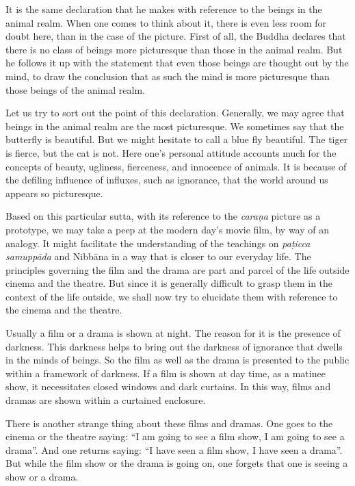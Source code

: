 It is the same declaration that he makes with reference to the beings in the animal realm. When one comes to think about it, there is even less room for doubt here, than in the case of the picture. First of all, the Buddha declares that there is no class of beings more picturesque than those in the animal realm. But he follows it up with the statement that even those beings are thought out by the mind, to draw the conclusion that as such the mind is more picturesque than those beings of the animal realm.

Let us try to sort out the point of this declaration. Generally, we may agree that beings in the animal realm are the most picturesque. We sometimes say that the butterfly is beautiful. But we might hesitate to call a blue fly beautiful. The tiger is fierce, but the cat is not. Here one's personal attitude accounts much for the concepts of beauty, ugliness, fierceness, and innocence of animals. It is because of the defiling influence of influxes, such as ignorance, that the world around us appears so picturesque.

Based on this particular sutta, with its reference to the \emph{caraṇa} picture as a prototype, we may take a peep at the modern day's movie film, by way of an analogy. It might facilitate the understanding of the teachings on \emph{paṭicca samuppāda} and Nibbāna in a way that is closer to our everyday life. The principles governing the film and the drama are part and parcel of the life outside cinema and the theatre. But since it is generally difficult to grasp them in the context of the life outside, we shall now try to elucidate them with reference to the cinema and the theatre.

Usually a film or a drama is shown at night. The reason for it is the presence of darkness. This darkness helps to bring out the darkness of ignorance that dwells in the minds of beings. So the film as well as the drama is presented to the public within a framework of darkness. If a film is shown at day time, as a matinee show, it necessitates closed windows and dark curtains. In this way, films and dramas are shown within a curtained enclosure.

There is another strange thing about these films and dramas. One goes to the cinema or the theatre saying: ``I am going to see a film show, I am going to see a drama''. And one returns saying: ``I have seen a film show, I have seen a drama''. But while the film show or the drama is going on, one forgets that one is seeing a show or a drama.

